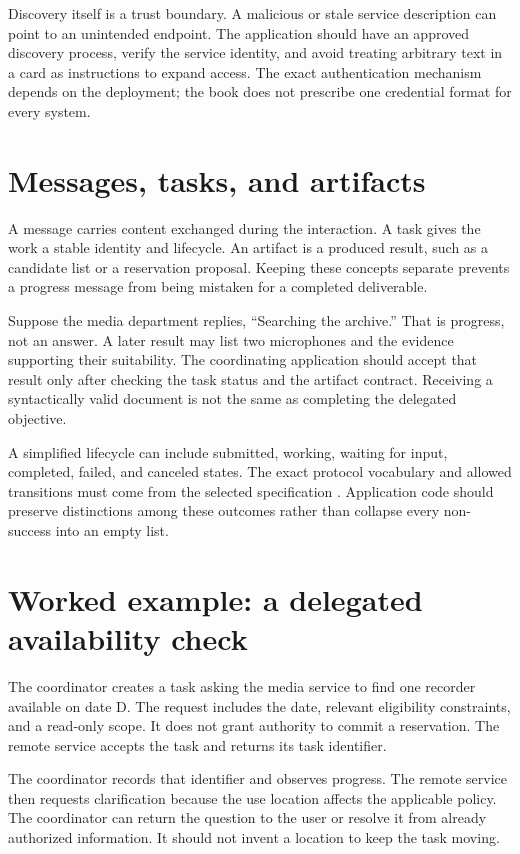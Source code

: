 Discovery itself is a trust boundary. A malicious or stale service description can point to an unintended endpoint. The application should have an approved discovery process, verify the service identity, and avoid treating arbitrary text in a card as instructions to expand access. The exact authentication mechanism depends on the deployment; the book does not prescribe one credential format for every system.

\section{Messages, tasks, and artifacts}
A message carries content exchanged during the interaction. A task gives the work a stable identity and lifecycle. An artifact is a produced result, such as a candidate list or a reservation proposal. Keeping these concepts separate prevents a progress message from being mistaken for a completed deliverable.

Suppose the media department replies, “Searching the archive.” That is progress, not an answer. A later result may list two microphones and the evidence supporting their suitability. The coordinating application should accept that result only after checking the task status and the artifact contract. Receiving a syntactically valid document is not the same as completing the delegated objective.

A simplified lifecycle can include submitted, working, waiting for input, completed, failed, and canceled states. The exact protocol vocabulary and allowed transitions must come from the selected specification \cite{a2a}. Application code should preserve distinctions among these outcomes rather than collapse every non-success into an empty list.

\section{Worked example: a delegated availability check}
The coordinator creates a task asking the media service to find one recorder available on date D. The request includes the date, relevant eligibility constraints, and a read-only scope. It does not grant authority to commit a reservation. The remote service accepts the task and returns its task identifier.

The coordinator records that identifier and observes progress. The remote service then requests clarification because the use location affects the applicable policy. The coordinator can return the question to the user or resolve it from already authorized information. It should not invent a location to keep the task moving.

